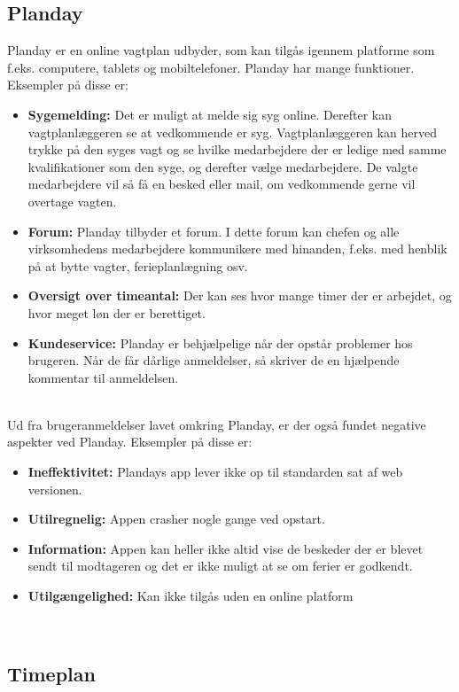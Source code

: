 \subsection{Planday}
Planday er en online vagtplan udbyder, som kan tilgås igennem platforme som f.eks. computere, tablets og mobiltelefoner. Planday har mange funktioner. Eksempler på disse er:
\begin{itemize}
\item {\textbf{Sygemelding:} Det er muligt at melde sig syg online. Derefter kan vagtplanlæggeren se at vedkommende er syg. Vagtplanlæggeren kan herved trykke på den syges vagt og se hvilke medarbejdere der er ledige med samme kvalifikationer som den syge, og derefter vælge medarbejdere. De valgte medarbejdere vil så få en besked eller mail, om vedkommende gerne vil overtage vagten.}
\item {\textbf{Forum:} Planday tilbyder et forum. I dette forum kan chefen og alle virksomhedens medarbejdere kommunikere med hinanden, f.eks. med henblik på at bytte vagter, ferieplanlægning osv.}
\item {\textbf{Oversigt over timeantal:} Der kan ses hvor mange timer der er arbejdet, og hvor meget løn der er berettiget.}
\item {\textbf{Kundeservice:} Planday er behjælpelige når der opstår problemer hos brugeren. Når de får dårlige anmeldelser, så skriver de en hjælpende kommentar til anmeldelsen.} 
\end{itemize} 
\citep{DanskInternetHandel, Simonsen2014, Planday}\\

\noindent Ud fra brugeranmeldelser lavet omkring Planday, er der også fundet negative aspekter ved Planday. Eksempler på disse er:
\begin{itemize}
\item {\textbf{Ineffektivitet:} Plandays app lever ikke op til standarden sat af web versionen.} 
\item {\textbf{Utilregnelig:} Appen crasher nogle gange ved opstart.}
\item {\textbf{Information:} Appen kan heller ikke altid vise de beskeder der er blevet sendt til modtageren og det er ikke muligt at se om ferier er godkendt.} 
\item {\textbf{Utilgængelighed:} Kan ikke tilgås uden en online platform} \end{itemize}
\citep{Play}\\

\subsection{Timeplan}

